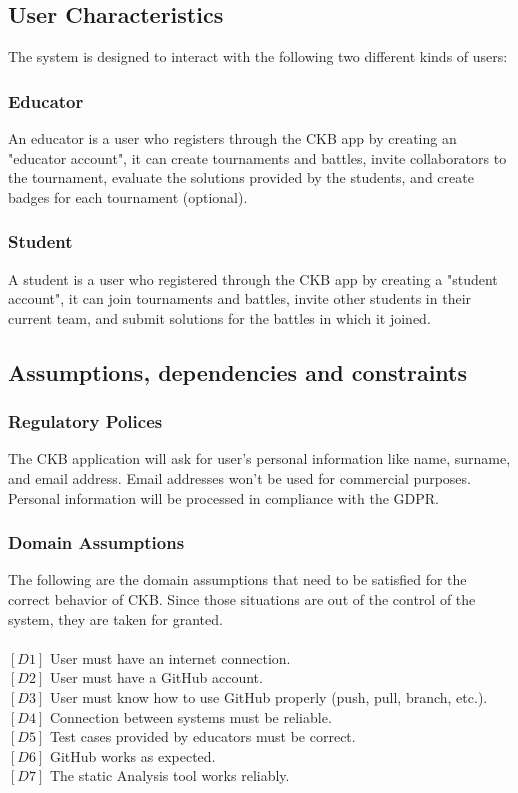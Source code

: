 \documentclass{article}
\begin{document}
\subsection{User Characteristics}
The system is designed to interact with the following two different kinds of users:
\subsubsection{Educator}
An educator is a user who registers through the CKB app by creating an "educator account", it can create tournaments and battles, invite collaborators to the tournament, evaluate the solutions provided by the students, and create badges for each tournament (optional).
\subsubsection{Student}
A student is a user who registered through the CKB app by creating a "student account", it can join tournaments and battles, invite other students in their current team, and submit solutions for the battles in which it joined.
\subsection{Assumptions, dependencies and constraints}

\subsubsection{Regulatory Polices}
The CKB application will ask for user's personal information like name, surname, and email address. Email addresses won’t be used for commercial purposes. Personal information will be processed in compliance with the GDPR.

\subsubsection{Domain Assumptions}
The following are the domain assumptions that need to be satisfied for the correct behavior of CKB. Since those situations are out of the control of the system, they are taken for granted.\\\\
$[D1]$ User must have an internet connection.\\
$[D2]$ User must have a GitHub account.\\
$[D3]$ User must know how to use GitHub properly (push, pull, branch, etc.).\\
$[D4]$ Connection between systems must be reliable.\\
$[D5]$ Test cases provided by educators must be correct.\\
$[D6]$ GitHub works as expected.\\
$[D7]$ The static Analysis tool works reliably.\\
\end{document}
